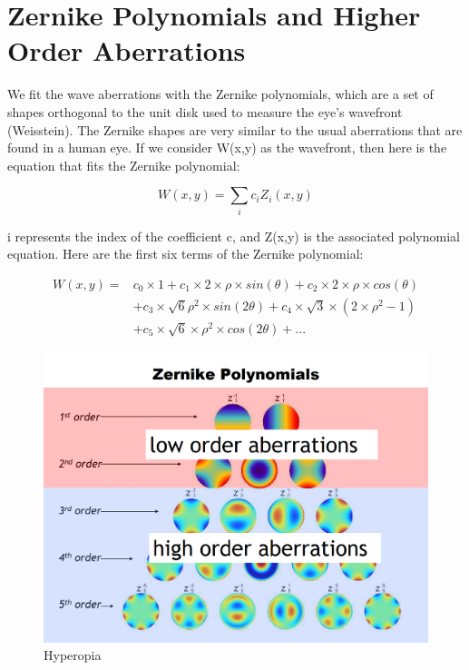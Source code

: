 \section{Zernike Polynomials and Higher Order Aberrations}

We fit the wave aberrations with the Zernike polynomials, which are a set of shapes orthogonal to the unit disk used to measure the eye’s wavefront (Weisstein). The Zernike shapes are very similar to the usual aberrations that are found in a human eye. If we consider W(x,y) as the wavefront, then here is the equation that fits the Zernike polynomial:

$$W(x,y)= \sum_{i} c_i Z_i (x,y)$$

i represents the index of the coefficient c, and Z(x,y) is the associated polynomial equation. Here are the first six terms of the Zernike polynomial:

\begin{equation}
\begin{aligned}
W(x,y) ={} & c_0 \times 1 + c_1 \times 2 \times \rho \times sin(\theta) + c_2 \times 2 \times \rho \times cos(\theta) \\
           & + c_3 \times \sqrt{6} \rho^2 \times sin(2\theta) + c_4 \times \sqrt{3} \times (2 \times \rho^2 - 1) \\
           & + c_5 \times \sqrt{6} \times \rho^2 \times cos(2\theta) + ...
\end{aligned}
\end{equation}

\begin{figure}[ht]
  \centering
  \includegraphics[width=5.0in]{chapters/chapter2/images/Zernike_polynomials.png}
  \caption{Hyperopia}
  \label{fig:ferrari}
\end{figure}

